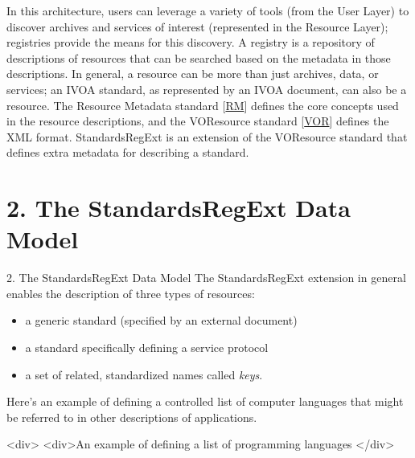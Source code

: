 \documentclass[11pt,a4paper]{ivoa}
\begin{document}
{{In this architecture, users can leverage a variety of tools (from the
User Layer) to discover archives and services of interest (represented
in the Resource Layer); registries provide the means for this
discovery. A registry is a repository of descriptions of resources
that can be searched based on the metadata in those descriptions. In
general, a resource can be more than just archives, data, or
services; an IVOA standard, as represented by an IVOA document, can
also be a resource.  The Resource Metadata standard
[\href{#RM}{RM}] defines the core concepts used in the resource
descriptions, and the VOResource standard [\href{#VOR}{VOR}] defines
the XML format.  StandardsRegExt is an extension of the VOResource
standard that defines extra metadata for describing a standard.  



\section{2. The StandardsRegExt Data Model}

\label{}

2. The StandardsRegExt Data Model
The StandardsRegExt extension in general enables the description of three
types of resources:

\begin{itemize}

\item  a generic standard (specified by an external document) {}

\item  a standard specifically defining a service protocol {}

\item  a set of related, standardized names called \emph{keys}.  {}

\end{itemize}


Here's an example of defining a controlled list of computer languages
that might be referred to in other descriptions of applications.



<div>
<div>An example of defining a list of
       programming languages </div>

}}
\end{document}
